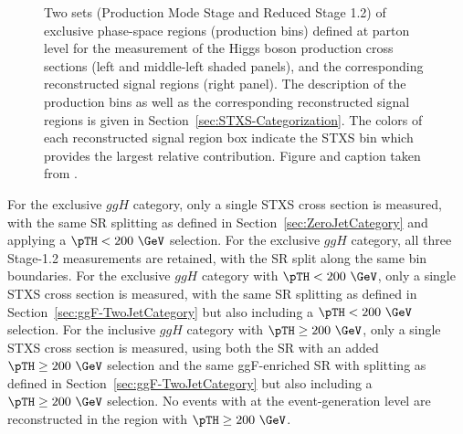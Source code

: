 \begin{figure}[t]
    \caption{Two sets (Production Mode Stage and Reduced Stage 1.2) of exclusive phase-space regions (production bins) defined at parton level for the measurement of the Higgs boson production cross sections (left and middle-left shaded panels), and the corresponding reconstructed signal regions (right panel).
    The description of the production bins as well as the corresponding reconstructed signal regions is given in Section~\ref{sec:STXS-Categorization}.
    The colors of each reconstructed signal region box indicate the STXS bin which provides the largest relative contribution. Figure and caption taken from .
    \label{fig:STXS_Diagram}
    }
\end{figure}
For the exclusive \ZeroJet $ggH$ category, only a single STXS cross section is measured, with the same SR splitting as defined in Section~\ref{sec:ZeroJetCategory} and applying a $\pTH < 200~\GeV$ selection.
For the exclusive \OneJet $ggH$ category, all three Stage-1.2 measurements are retained, with the SR split along the same \pTH bin boundaries.
For the exclusive \TwoJet $ggH$ category with $\pTH < 200~\GeV$, only a single STXS cross section is measured, with the same SR splitting as defined in Section~\ref{sec:ggF-TwoJetCategory} but also including a $\pTH < 200~\GeV$ selection.
For the \Njets inclusive $ggH$ category with $\pTH \ge200~\GeV$, only a single STXS cross section is measured, using both the \OneJet SR with an added $\pTH \ge200~\GeV$ selection and the same ggF-enriched \TwoJet SR with splitting as defined in Section~\ref{sec:ggF-TwoJetCategory} but also including a $\pTH \ge200~\GeV$ selection. No events with \ZeroJet at the event-generation level are reconstructed in the region with $\pTH \ge200~\GeV$.
